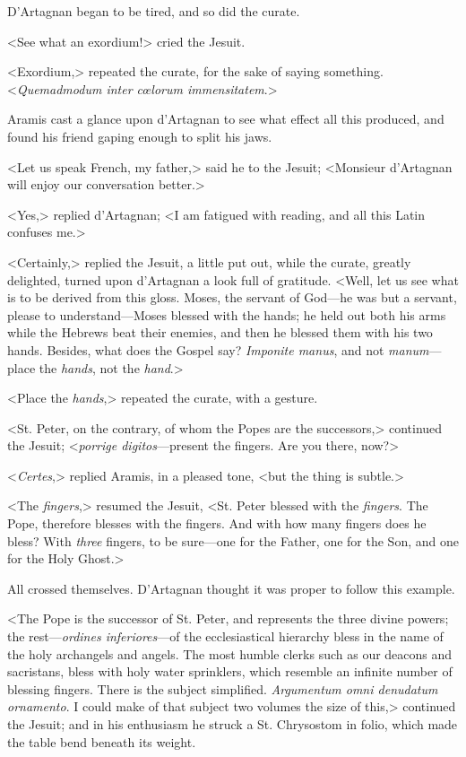 D'Artagnan began to be tired, and so did the curate. 

<See what an exordium!> cried the Jesuit. 

<Exordium,> repeated the curate, for the sake of saying something. <\textit{Quemadmodum inter cœlorum immensitatem}.> 

Aramis cast a glance upon d'Artagnan to see what effect all this produced, and found his friend gaping enough to split his jaws. 

<Let us speak French, my father,> said he to the Jesuit; <Monsieur d'Artagnan will enjoy our conversation better.> 

<Yes,> replied d'Artagnan; <I am fatigued with reading, and all this Latin confuses me.> 

<Certainly,> replied the Jesuit, a little put out, while the curate, greatly delighted, turned upon d'Artagnan a look full of gratitude. <Well, let us see what is to be derived from this gloss. Moses, the servant of God---he was but a servant, please to understand---Moses blessed with the hands; he held out both his arms while the Hebrews beat their enemies, and then he blessed them with his two hands. Besides, what does the Gospel say? \textit{Imponite manus}, and not \textit{manum}---place the \textit{hands}, not the \textit{hand}.> 

<Place the \textit{hands},> repeated the curate, with a gesture. 

<St. Peter, on the contrary, of whom the Popes are the successors,> continued the Jesuit; <\textit{porrige digitos}---present the fingers. Are you there, now?> 

<\textit{Certes},> replied Aramis, in a pleased tone, <but the thing is subtle.> 

<The \textit{fingers},> resumed the Jesuit, <St. Peter blessed with the \textit{fingers}. The Pope, therefore blesses with the fingers. And with how many fingers does he bless? With \textit{three} fingers, to be sure---one for the Father, one for the Son, and one for the Holy Ghost.> 

All crossed themselves. D'Artagnan thought it was proper to follow this example. 

<The Pope is the successor of St. Peter, and represents the three divine powers; the rest---\textit{ordines inferiores}---of the ecclesiastical hierarchy bless in the name of the holy archangels and angels. The most humble clerks such as our deacons and sacristans, bless with holy water sprinklers, which resemble an infinite number of blessing fingers. There is the subject simplified. \textit{Argumentum omni denudatum ornamento}. I could make of that subject two volumes the size of this,> continued the Jesuit; and in his enthusiasm he struck a St. Chrysostom in folio, which made the table bend beneath its weight. 

